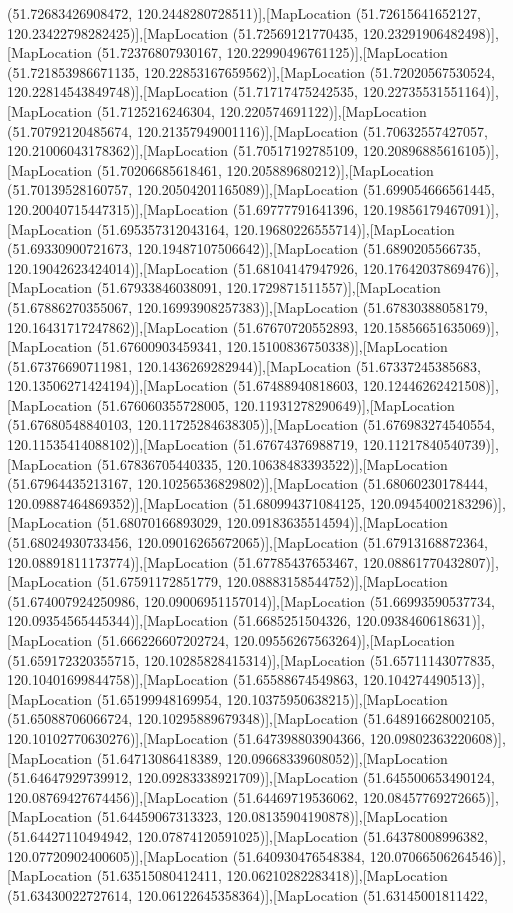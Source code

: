 (51.72683426908472, 120.2448280728511)],[MapLocation (51.72615641652127, 120.23422798282425)],[MapLocation (51.72569121770435, 120.23291906482498)],[MapLocation (51.72376807930167, 120.22990496761125)],[MapLocation (51.721853986671135, 120.22853167659562)],[MapLocation (51.72020567530524, 120.22814543849748)],[MapLocation (51.71717475242535, 120.22735531551164)],[MapLocation (51.7125216246304, 120.220574691122)],[MapLocation (51.70792120485674, 120.21357949001116)],[MapLocation (51.70632557427057, 120.21006043178362)],[MapLocation (51.70517192785109, 120.20896885616105)],[MapLocation (51.70206685618461, 120.205889680212)],[MapLocation (51.70139528160757, 120.20504201165089)],[MapLocation (51.699054666561445, 120.20040715447315)],[MapLocation (51.69777791641396, 120.19856179467091)],[MapLocation (51.695357312043164, 120.19680226555714)],[MapLocation (51.69330900721673, 120.19487107506642)],[MapLocation (51.6890205566735, 120.19042623424014)],[MapLocation (51.68104147947926, 120.17642037869476)],[MapLocation (51.67933846038091, 120.1729871511557)],[MapLocation (51.67886270355067, 120.16993908257383)],[MapLocation (51.67830388058179, 120.16431717247862)],[MapLocation (51.67670720552893, 120.15856651635069)],[MapLocation (51.67600903459341, 120.15100836750338)],[MapLocation (51.67376690711981, 120.1436269282944)],[MapLocation (51.67337245385683, 120.13506271424194)],[MapLocation (51.67488940818603, 120.12446262421508)],[MapLocation (51.676060355728005, 120.11931278290649)],[MapLocation (51.67680548840103, 120.11725284638305)],[MapLocation (51.676983274540554, 120.11535414088102)],[MapLocation (51.67674376988719, 120.11217840540739)],[MapLocation (51.67836705440335, 120.10638483393522)],[MapLocation (51.67964435213167, 120.10256536829802)],[MapLocation (51.68060230178444, 120.09887464869352)],[MapLocation (51.680994371084125, 120.09454002183296)],[MapLocation (51.68070166893029, 120.09183635514594)],[MapLocation (51.68024930733456, 120.09016265672065)],[MapLocation (51.67913168872364, 120.08891811173774)],[MapLocation (51.67785437653467, 120.08861770432807)],[MapLocation (51.67591172851779, 120.08883158544752)],[MapLocation (51.674007924250986, 120.09006951157014)],[MapLocation (51.66993590537734, 120.09354565445344)],[MapLocation (51.6685251504326, 120.0938460618631)],[MapLocation (51.666226607202724, 120.09556267563264)],[MapLocation (51.659172320355715, 120.10285828415314)],[MapLocation (51.65711143077835, 120.10401699844758)],[MapLocation (51.65588674549863, 120.104274490513)],[MapLocation (51.65199948169954, 120.10375950638215)],[MapLocation (51.65088706066724, 120.10295889679348)],[MapLocation (51.648916628002105, 120.10102770630276)],[MapLocation (51.647398803904366, 120.09802363220608)],[MapLocation (51.64713086418389, 120.09668339608052)],[MapLocation (51.64647929739912, 120.09283338921709)],[MapLocation (51.645500653490124, 120.08769427674456)],[MapLocation (51.64469719536062, 120.08457769272665)],[MapLocation (51.64459067313323, 120.08135904190878)],[MapLocation (51.64427110494942, 120.07874120591025)],[MapLocation (51.64378008996382, 120.07720902400605)],[MapLocation (51.640930476548384, 120.07066506264546)],[MapLocation (51.63515080412411, 120.06210282283418)],[MapLocation (51.63430022727614, 120.06122645358364)],[MapLocation (51.63145001811422, 